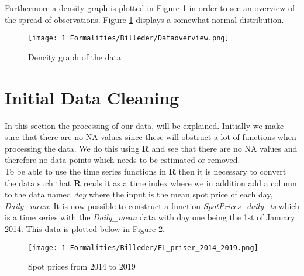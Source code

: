 \noindent Furthermore a density graph is plotted in Figure \ref{fig:observations_density} in order to see an overview of the spread of observations. Figure \ref{fig:observations_density} displays a somewhat normal distribution.
\begin{figure}[H]
    \centering
    \texttt{[image: 1 Formalities/Billeder/Dataoverview.png]}
    \caption{Dencity graph of the data}
    \label{fig:observations_density}
\end{figure}
\begin{comment}
    sorted_data <- sort(spot_prices_data$records$SpotPriceDKK)

# Plot the sorted data
plot(sorted_data, type = "l", xlab = "Observation", ylab = "SpotPriceDKK", main = "Sorted SpotPriceDKK Data")

# Estimate the probability density function (PDF) of the sorted data
density_data <- density(sorted_data)

# Plot the density
plot(density_data, main = "", xlab = "SpotPriceDKK", ylab = "Density")

# Add add datapoints
rug(sorted_data, col = "blue", lwd = 0.5, side = 1)

# Add mean line
abline(v = 230, col = "red", lty = 1 , lwd = 3)

# Legend
legend("topright", legend = c("Mean", "Observations"), 
       col = c("red", "blue"), lty = c(1, 1), lwd = c(3, 1))
\end{comment}

\section{Initial Data Cleaning}
In this section the processing of our data, will be explained. Initially we make sure that there are no NA values since these will obstruct a lot of functions when processing the data. We do this using \textbf{R} and see that there are no NA values and therefore no data points which needs to be estimated or removed.\\
To be able to use the time series functions in \textbf{R} then it is necessary to convert the data such that \textbf{R} reads it as a time index where we in addition add a column to the data named \textit{day} where the input is the mean spot price of each day, \textit{Daily\_mean}. It is now possible to construct a function \textit{SpotPrices}\_\textit{daily}\_\textit{ts} which is a time series with the \textit{Daily\_mean} data with day one being the 1st of January 2014. This data is plotted below in Figure \ref{fig:daily_data_ts}.
\begin{figure}[H]
    \centering
    \texttt{[image: 1 Formalities/Billeder/EL\_priser\_2014\_2019.png]}
    \caption{Spot prices from 2014 to 2019}
    \label{fig:daily_data_ts}
\end{figure}
